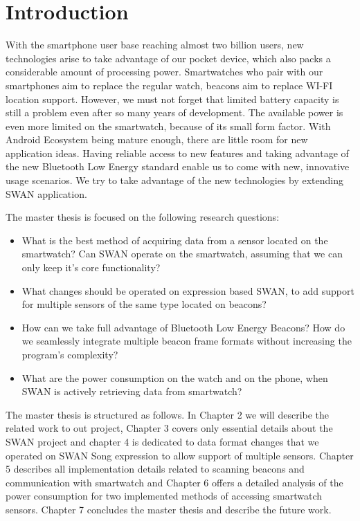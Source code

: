 
\chapter{Introduction} %

\label{Chapter1} %


With the smartphone user base reaching almost two billion users, new technologies arise to take advantage of our pocket device, which also packs a considerable amount of processing power.
Smartwatches who pair with our smartphones aim to replace the regular watch, beacons aim to replace WI-FI location support. 
However, we must not forget that limited battery capacity is still a problem even after so many years of development. The available power is even more limited on the smartwatch, because of
its small form factor.
With Android Ecosystem being mature enough, there are little room for new application ideas. Having reliable access to new features and taking advantage of the new Bluetooth Low Energy standard
enable us to come with new, innovative usage scenarios. We try to take advantage of the new technologies by extending SWAN application.

The master thesis is focused on the following research questions:

\begin{itemize}
 \item What is the best method of acquiring data from a sensor located on the smartwatch? Can SWAN operate on the smartwatch, assuming that we can only keep it's core functionality?
 \item What changes should be operated on expression based SWAN, to add support for multiple sensors of the same type located on beacons?
 \item How can we take full advantage of Bluetooth Low Energy Beacons? How do we seamlessly integrate multiple beacon frame formats without increasing the program's complexity?
 \item What are the power consumption on the watch and on the  phone, when SWAN is actively retrieving data from smartwatch?
\end{itemize}

The master thesis is structured as follows. In Chapter 2 we will describe the related work to out project, Chapter 3 covers only essential details about the SWAN project and chapter 4 is dedicated to 
data format changes that we operated on SWAN Song expression to allow support of multiple sensors. Chapter 5 describes all implementation details related to scanning beacons and communication
with smartwatch and Chapter 6 offers a detailed analysis of the power consumption for two implemented methods of accessing smartwatch sensors. Chapter 7 concludes the master thesis and describe 
the future work.

